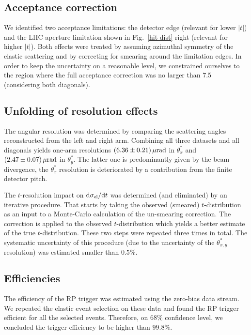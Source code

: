 \documentclass[doublecol]{../macros/epl2}
\def\d{{\rm d}}
\def\un#1{\,{\rm #1}}
\begin{document}
\subsection{Acceptance correction}

We identified two acceptance limitations: the detector edge (relevant for lower $|t|$) and the LHC aperture limitation shown in Fig.~\ref{hit dist} right (relevant for higher $|t|$). Both effects were treated by assuming azimuthal symmetry of the elastic scattering and by correcting for smearing around the limitation edges. In order to keep the uncertainty on a reasonable level, we constrained ourselves to the region where the full acceptance correction was no larger than 7.5 (considering both diagonals).


\subsection{Unfolding of resolution effects}

The angular resolution was determined by comparing the scattering angles reconstructed from the left and right arm. Combining all three datasets and all diagonals yields one-arm resolutions $(6.36\pm 0.21)\un{\mu rad}$ in $\theta^*_x$ and $(2.47\pm 0.07)\un{\mu rad}$ in $\theta^*_y$. The latter one is predominantly given by the beam-divergence, the $\theta^*_x$ resolution is deteriorated by a contribution from the finite detector pitch.

The $t$-resolution impact on $\d\sigma_{\rm el}/\d t$  was determined (and eliminated) by an iterative procedure. That starts by taking the observed (smeared) $t$-distribution as an input to a Monte-Carlo calculation of the un-smearing correction. The correction is applied to the observed $t$-distribution which yields a better estimate of the true $t$-distribution. These two steps were repeated three times in total. The systematic uncertainty of this procedure (due to the uncertainty of the $\theta^*_{x, y}$ resolution) was estimated smaller than $0.5\%$.

\subsection{Efficiencies}

The efficiency of the RP trigger was estimated using the zero-bias data stream. We repeated the elastic event selection on these data and found the RP trigger efficient for all the selected events. Therefore, on $68\%$ confidence level, we concluded the trigger efficiency to be higher than $99.8\%$.
\end{document}
